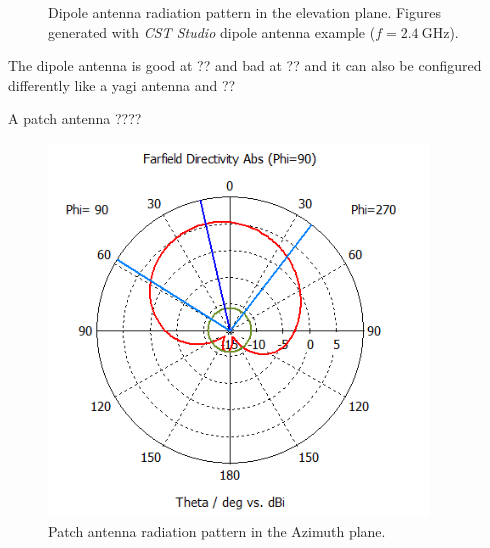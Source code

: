 \begin{figure}[H]
\begin{minipage}{0.45\textwidth}
        \caption{Dipole antenna radiation pattern in the elevation plane. Figures generated with \textit{CST Studio} dipole antenna example ($f=\SI{2.4}{\giga\hertz}$).}
        \label{fig:dipole_2}
    \end{minipage}
\end{figure}
The dipole antenna is good at ?? and bad at ?? and it can also be configured differently like a yagi antenna and ??

A patch antenna ????%
\begin{figure}[H]
    \begin{minipage}{0.45\textwidth}
        \centering
        \includegraphics[width=0.9\textwidth]{figures/farfield (f=2.4) patch.png} %
        \caption{Patch antenna radiation pattern in the Azimuth plane.} 
        \label{fig:patch_1}
    \end{minipage}\hfill
    \begin{minipage}{0.45\textwidth}
        \centering

\end{minipage}
\end{figure}
